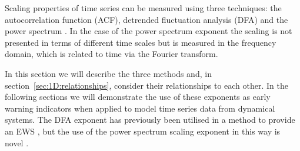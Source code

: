 Scaling properties of time series can be measured using three techniques: the autocorrelation function (ACF), detrended fluctuation analysis (DFA) and the power spectrum \citep{bak1988, kantelhardt2001}. {\Red In the case of the power spectrum exponent the scaling is not presented in terms of different time scales but is measured in the frequency domain, which is related to time via the Fourier transform.}

In this section we will describe the three methods and, in section~\ref{sec:1D:relationships}, consider their relationships to each other. In the following sections we will demonstrate the use of these exponents as early warning indicators when applied to model time series data from dynamical systems. The DFA exponent has previously been utilised in a method to provide an EWS \citep{livina2007}, but the use of the power spectrum scaling exponent in this way is novel \citep{prettyman2018}.  

